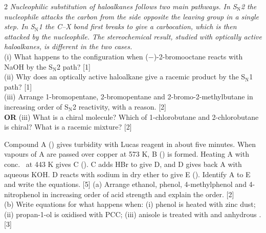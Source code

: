 \documentclass[10pt,a4paper]{extarticle}
\newcommand{\mk}[1]{{\scriptsize\color{black!55}[#1]}}
\begin{document}
\begin{multicols}{2}
\Q \textit{Nucleophilic substitution of haloalkanes follows two main pathways. In S$_\text{N}$2 the nucleophile attacks the carbon from the side opposite the leaving group in a single step. In S$_\text{N}$1 the C--X bond first breaks to give a carbocation, which is then attacked by the nucleophile. The stereochemical result, studied with optically active haloalkanes, is different in the two cases.}\\[2pt]
(i) What happens to the configuration when ($-$)-2-bromooctane reacts with NaOH by the S$_\text{N}$2 path? \mk{1}\\
(ii) Why does an optically active haloalkane give a racemic product by the S$_\text{N}$1 path? \mk{1}\\
(iii) Arrange 1-bromopentane, 2-bromopentane and 2-bromo-2-methylbutane in increasing order of S$_\text{N}$2 reactivity, with a reason. \mk{2}\\
\textbf{OR} (iii) What is a chiral molecule? Which of 1-chlorobutane and 2-chlorobutane is chiral? What is a racemic mixture? \mk{2}

\Q Compound A () gives turbidity with Lucas reagent in about five minutes. When vapours of A are passed over copper at 573 K, B () is formed. Heating A with conc.\  at 443 K gives C (). C adds HBr to give D, and D gives back A with aqueous KOH. D reacts with sodium in dry ether to give E (). Identify A to E and write the equations. \mk{5}
\Q (a) Arrange ethanol, phenol, 4-methylphenol and 4-nitrophenol in increasing order of acid strength and explain the order. \mk{2}\\
(b) Write equations for what happens when: (i) phenol is heated with zinc dust; (ii) propan-1-ol is oxidised with PCC; (iii) anisole is treated with  and anhydrous . \mk{3}
\end{multicols}
\end{document}
